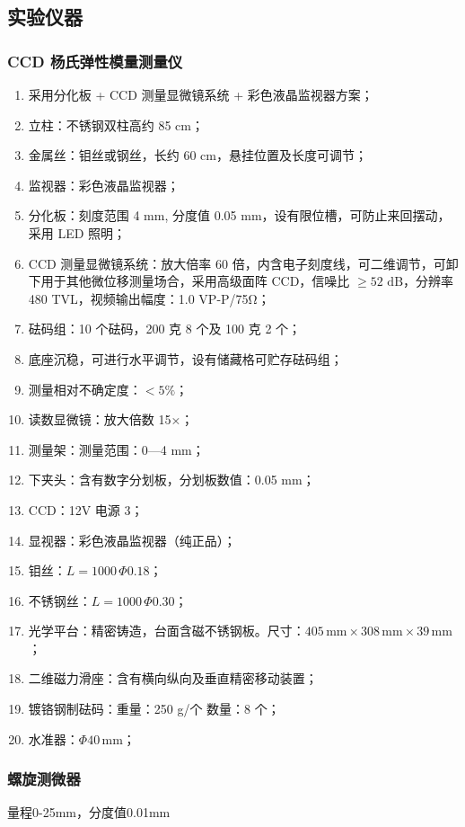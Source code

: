 \documentclass[zihao=5, UTF8]{article}
\theoremstyle{MyLineTheoremStyle} %
\theoremstyle{MyBlockTheoremStyle} %
\theoremstyle{MySubsubsectionStyle} %
\begin{document}
\subsection{实验仪器}
\subsubsection{CCD 杨氏弹性模量测量仪}
\begin{enumerate}
    \item 采用分化板 + CCD 测量显微镜系统 + 彩色液晶监视器方案；
    \item 立柱：不锈钢双柱高约 85 cm；
    \item 金属丝：钼丝或钢丝，长约 60 cm，悬挂位置及长度可调节；
    \item 监视器：彩色液晶监视器；
    \item 分化板：刻度范围 4 mm, 分度值 0.05 mm，设有限位槽，可防止来回摆动，采用 LED 照明；
    \item CCD 测量显微镜系统：放大倍率 60 倍，内含电子刻度线，可二维调节，可卸下用于其他微位移测量场合，采用高级面阵 CCD，信噪比 $\geq 52 \text{ dB}$，分辨率 480 TVL，视频输出幅度：1.0 VP-P/75Ω；
    \item 砝码组：10 个砝码，200 克 8 个及 100 克 2 个；
    \item 底座沉稳，可进行水平调节，设有储藏格可贮存砝码组；
    \item 测量相对不确定度：$< 5\%$；
    \item 读数显微镜：放大倍数 15×；
    \item 测量架：测量范围：0—4 mm；
    \item 下夹头：含有数字分划板，分划板数值：0.05 mm；
    \item CCD：12V 电源 3；
    \item 显视器：彩色液晶监视器（纯正品）；
    \item 钼丝：$L = 1000 \, \Phi 0.18$；
    \item 不锈钢丝：$L = 1000 \, \Phi 0.30$；
    \item 光学平台：精密铸造，台面含磁不锈钢板。尺寸：$405 \, \text{mm} \times 308 \, \text{mm} \times 39 \, \text{mm}$；
    \item 二维磁力滑座：含有横向纵向及垂直精密移动装置；
    \item 镀铬钢制砝码：重量：250 g/个 数量：8 个；
    \item 水准器：$\Phi 40 \, \text{mm}$；
\end{enumerate}
\subsubsection{螺旋测微器}
量程0-25mm，分度值0.01mm
\end{document}
